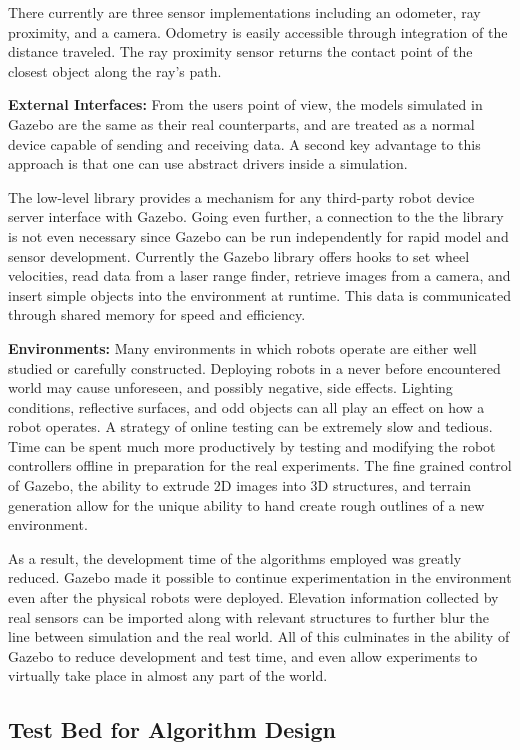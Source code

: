 There currently are three sensor implementations including an odometer, ray proximity, and a camera. Odometry is easily accessible through integration of the distance traveled. The ray proximity sensor returns the contact point of the closest object along the ray's path.

\textbf{External Interfaces:} From the users point of view, the models simulated in Gazebo are the same as their real counterparts, and are treated as a normal device capable of sending and receiving data. A second key advantage to this approach is that one can use abstract drivers inside a simulation. 

The low-level library provides a mechanism for any third-party robot device server interface with Gazebo. Going even further, a connection to the the library is not even necessary since Gazebo can be run independently for rapid model and sensor development. Currently the Gazebo library offers hooks to set wheel velocities, read data from a laser range finder, retrieve images from a camera, and insert simple objects into the environment at runtime. This data is communicated through shared memory for speed and efficiency.

\textbf{Environments:} Many environments in which robots operate are either well studied or carefully constructed. Deploying robots in a never before encountered world may cause unforeseen, and possibly negative, side effects. Lighting conditions, reflective surfaces, and odd objects can all play an effect on how a robot operates. A strategy of online testing can be extremely slow and tedious. Time can be spent much more productively by testing and modifying the robot controllers offline in preparation for the real experiments. The fine grained control of Gazebo, the ability to extrude 2D images into 3D structures, and terrain generation allow for the unique ability to hand create rough outlines of a new environment. 

As a result, the development time of the algorithms employed was greatly reduced. Gazebo made it possible to continue experimentation in the environment even after the physical robots were deployed. Elevation information collected by real sensors can be imported along with relevant structures to further blur the line between simulation and the real world. All of this culminates in the ability of Gazebo to reduce development and test time, and even allow experiments to virtually take place in almost any part of the world.

\subsection{Test Bed for Algorithm Design}

